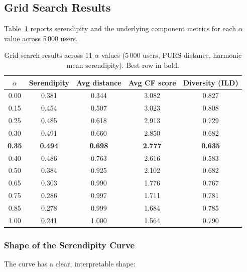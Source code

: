 \subsection{Grid Search Results}

Table~\ref{tab:exp2_grid} reports serendipity and the underlying component
metrics for each $\alpha$ value across 5\,000 users.

\begin{table}[h]
\centering
\caption{Grid search results across 11 $\alpha$ values (5\,000 users,
         PURS distance, harmonic mean serendipity).
         Best row in bold.}
\label{tab:exp2_grid}
\begin{tabular}{ccccc}
\toprule
\textbf{$\alpha$} & \textbf{Serendipity} & \textbf{Avg distance} & \textbf{Avg CF score} & \textbf{Diversity (ILD)} \\
\midrule
0.00 & 0.381 & 0.344 & 3.082 & 0.827 \\
0.15 & 0.454 & 0.507 & 3.023 & 0.808 \\
0.25 & 0.485 & 0.618 & 2.913 & 0.729 \\
0.30 & 0.491 & 0.660 & 2.850 & 0.682 \\
\textbf{0.35} & \textbf{0.494} & \textbf{0.698} & \textbf{2.777} & \textbf{0.635} \\
0.40 & 0.486 & 0.763 & 2.616 & 0.583 \\
0.50 & 0.384 & 0.925 & 2.102 & 0.682 \\
0.65 & 0.303 & 0.990 & 1.776 & 0.767 \\
0.75 & 0.286 & 0.997 & 1.711 & 0.781 \\
0.85 & 0.278 & 0.999 & 1.684 & 0.785 \\
1.00 & 0.241 & 1.000 & 1.564 & 0.790 \\
\bottomrule
\end{tabular}
\end{table}

\subsubsection{Shape of the Serendipity Curve}

The curve has a clear, interpretable shape:

